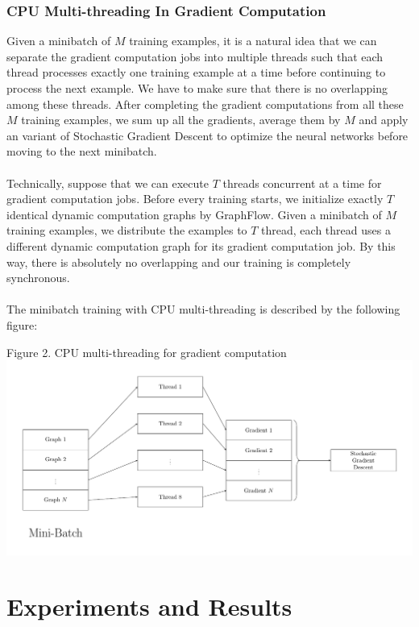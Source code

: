 \documentclass[a4paper]{article}
\begin{document}
\subsubsection{CPU Multi-threading In Gradient Computation}

Given a minibatch of $M$ training examples, it is a natural idea that we can separate the gradient computation jobs into multiple threads such that each thread processes exactly one training example at a time before continuing to process the next example. We have to make sure that there is no overlapping among these threads. After completing the gradient computations from all these $M$ training examples, we sum up all the gradients, average them by $M$ and apply an variant of Stochastic Gradient Descent to optimize the neural networks before moving to the next minibatch. \\ \\
Technically, suppose that we can execute $T$ threads concurrent at a time for gradient computation jobs. Before every training starts, we initialize exactly $T$ identical dynamic computation graphs by GraphFlow. Given a minibatch of $M$ training examples, we distribute the examples to $T$ thread, each thread uses a different dynamic computation graph for its gradient computation job. By this way, there is absolutely no overlapping and our training is completely synchronous. \\ \\
The minibatch training with CPU multi-threading is described by the following figure: 

\begin{center}
Figure 2. CPU multi-threading for gradient computation
\includegraphics[scale=0.36]{CPU_box_flow}
\end{center}

\section{Experiments and Results}
\end{document}
